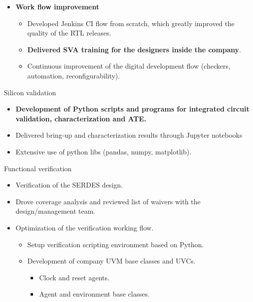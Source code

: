 \begin{cventries}
{\begin{cvitems}
\begin{itemize}
\begin{itemize}
          \end{itemize}
          \item {\textbf{Work flow improvement}}
          \begin{itemize}
            \item {Developed Jenkins CI flow from scratch, which greatly improved the quality of the RTL releases.}
            \item {\textbf{Delivered SVA training for the designers inside the company}.}
            \item {Continuous improvement of the digital development flow (checkers, automation, reconfigurability).}
          \end{itemize}
        \end{itemize}
        \item {Silicon validation}
          \begin{itemize}
            \item {\textbf{Development of Python scripts and programs for integrated circuit validation, characterization and ATE.}}
            \item {Delivered bring-up and characterization results through Jupyter notebooks}
            \item {Extensive use of python libs (pandas, numpy, matplotlib).}
          \end{itemize}
        \item {Functional verification}
        \begin{itemize}
          \item {Verification of the SERDES design.}
          \item {Drove coverage analysis and reviewed list of waivers with the design/management team.}
          \item {Optimization of the verification working flow.}
          \begin{itemize}
            \item {Setup verification scripting environment based on Python.}
            \item {Development of company UVM base classes and UVCs.}
              \begin{itemize}
                \item {Clock and reset agents.}
                \item {Agent and environment base classes.}
              \end{itemize}

\end{itemize}
\end{itemize}
\end{cvitems}}
\end{cventries}
